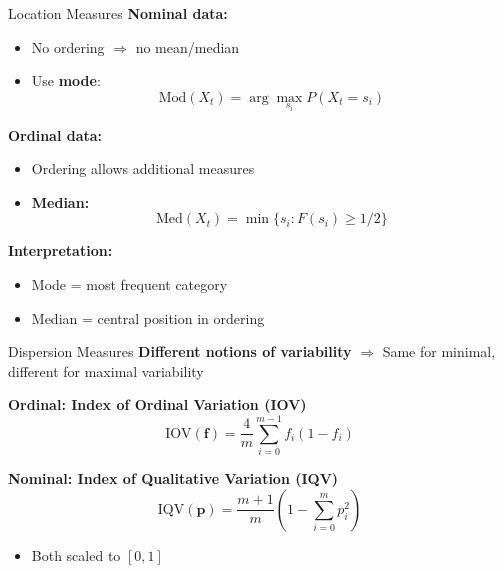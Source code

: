 \documentclass{beamer}
\begin{document}
\begin{frame}{Location Measures}
\textbf{Nominal data:}
\begin{itemize}
    \item No ordering $\Rightarrow$ no mean/median
    \item Use \textbf{mode}:
\[
\text{Mod}(X_t) = \arg\max_{s_i} P(X_t = s_i)
\]
\end{itemize}

\vspace{0.5cm}

\textbf{Ordinal data:}
\begin{itemize}
    \item Ordering allows additional measures
    \item \textbf{Median:}
\[
\text{Med}(X_t) = \min \{ s_i : F(s_i) \geq 1/2 \}
\]
\end{itemize}

\vspace{0.3cm}

\textbf{Interpretation:}
\begin{itemize}
    \item Mode = most frequent category
    \item Median = central position in ordering
\end{itemize}
\end{frame}

\begin{frame}{Dispersion Measures}
\textbf{Different notions of variability}
$\Rightarrow$ Same for minimal, different for maximal variability
\vspace{0.5cm}

\textbf{Ordinal: Index of Ordinal Variation (IOV)}
\[
\text{IOV}(\boldsymbol{f}) = \frac{4}{m} \sum_{i=0}^{m-1} f_i (1 - f_i)
\]

\vspace{0.5cm}

\textbf{Nominal: Index of Qualitative Variation (IQV)}
\[
\text{IQV}(\boldsymbol{p}) = \frac{m+1}{m} \left(1 - \sum_{i=0}^{m} p_i^2 \right)
\]

\vspace{0.5cm}

\begin{itemize}
    \item Both scaled to $[0,1]$
\end{itemize}
\end{frame}
\end{document}
